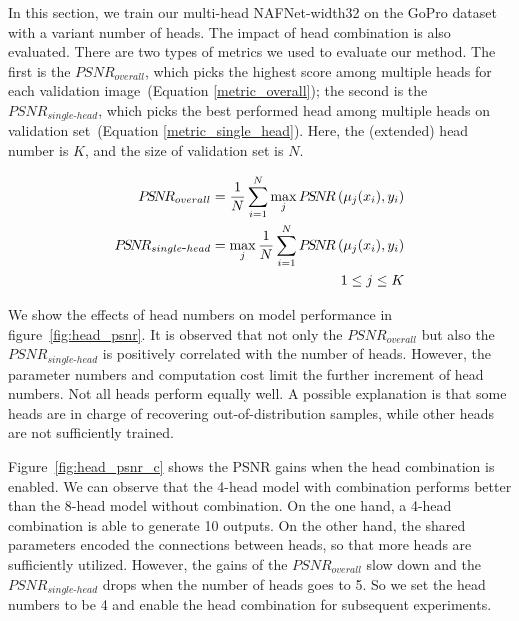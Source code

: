 \documentclass[letterpaper]{article} \usepackage{aaai23}  \usepackage{times}  \usepackage{helvet}  \usepackage{courier}  \usepackage[hyphens]{url}  \usepackage{graphicx} \urlstyle{rm} \def\UrlFont{\rm}  \usepackage{natbib}  \usepackage{caption} \frenchspacing  \setlength{\pdfpagewidth}{8.5in} \setlength{\pdfpageheight}{11in} \usepackage{algorithm}
\begin{document}
In this section, we train our multi-head NAFNet-width32 on the GoPro dataset with a variant number of heads. The impact of head combination is also evaluated. There are two types of metrics we used to evaluate our method. The first is the $P\!S\!N\!R_{overall}$, which picks the highest score among multiple heads for each validation image~(Equation \ref{metric_overall}); the second is the $P\!S\!N\!R_{single\mbox{-}head}$, which picks the best performed head among multiple heads on validation set~(Equation \ref{metric_single_head}). Here, the (extended) head number is $K$, and the size of validation set is $N$.






\begin{subequations}
\begin{align}
P\!S\!N\!R_{overall} = \frac{1}{N}\sum_{i=1}^N \max_j P\!S\!N\!R\left(\mu_j(x_i),y_i\right) \label{metric_overall}\\
P\!S\!N\!R_{single\mbox{-}head} = \max_j \frac{1}{N}\sum_{i=1}^N  P\!S\!N\!R\left(\mu_j(x_i),y_i\right) \label{metric_single_head}\\
1\leq j \leq K\notag
\end{align}
\end{subequations}

We show the effects of head numbers on model performance in figure~\ref{fig:head_psnr}. It is observed that not only the $P\!S\!N\!R_{overall}$ but also the $P\!S\!N\!R_{single\mbox{-}head}$ is positively correlated with the number of heads. However, the parameter numbers and computation cost limit the further increment of head numbers. Not all heads perform equally well. A possible explanation is that some heads are in charge of recovering out-of-distribution samples, while other heads are not sufficiently trained. 

Figure~\ref{fig:head_psnr_c} shows the PSNR gains when the head combination is enabled. We can observe that the 4-head model with combination performs better than the 8-head model without combination. On the one hand, a 4-head combination is able to generate 10 outputs. On the other hand, the shared parameters encoded the connections between heads, so that more heads are sufficiently utilized. However, the gains of the $P\!S\!N\!R_{overall}$ slow down and the $P\!S\!N\!R_{single\mbox{-}head}$ drops when the number of heads goes to 5. So we set the head numbers to be 4 and enable the head combination for subsequent experiments.
\end{document}
